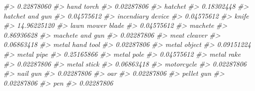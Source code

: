 \documentclass[
]{krantz}
\makeatletter
\newenvironment{Shaded}{\begin{snugshade}}{\end{snugshade}}
\newcommand{\CommentTok}[1]{\textcolor[rgb]{0.37,0.37,0.37}{\textit{#1}}}
\newenvironment{kframe}{%
\medskip{}
\setlength{\fboxsep}{.8em}
 \def\at@end@of@kframe{}%
 \ifinner\ifhmode%
  \def\at@end@of@kframe{\end{minipage}}%
  \begin{minipage}{\columnwidth}%
 \fi\fi%
 \def\FrameCommand##1{\hskip\@totalleftmargin \hskip-\fboxsep
 \colorbox{shadecolor}{##1}\hskip-\fboxsep
     \hskip-\linewidth \hskip-\@totalleftmargin \hskip\columnwidth}%
 \MakeFramed {\advance\hsize-\width
   \@totalleftmargin\z@ \linewidth\hsize
   \@setminipage}}%
 {\par\unskip\endMakeFramed%
 \at@end@of@kframe}
\renewenvironment{Shaded}{\begin{kframe}}{\end{kframe}}
\makeatother
\begin{document}
\begin{Shaded}
\begin{Highlighting}[]
\CommentTok{\#\textgreater{}                       0.22878060 }
\CommentTok{\#\textgreater{}                       hand torch }
\CommentTok{\#\textgreater{}                       0.02287806 }
\CommentTok{\#\textgreater{}                          hatchet }
\CommentTok{\#\textgreater{}                       0.18302448 }
\CommentTok{\#\textgreater{}                  hatchet and gun }
\CommentTok{\#\textgreater{}                       0.04575612 }
\CommentTok{\#\textgreater{}                incendiary device }
\CommentTok{\#\textgreater{}                       0.04575612 }
\CommentTok{\#\textgreater{}                            knife }
\CommentTok{\#\textgreater{}                      14.96225120 }
\CommentTok{\#\textgreater{}                 lawn mower blade }
\CommentTok{\#\textgreater{}                       0.04575612 }
\CommentTok{\#\textgreater{}                          machete }
\CommentTok{\#\textgreater{}                       0.86936628 }
\CommentTok{\#\textgreater{}                  machete and gun }
\CommentTok{\#\textgreater{}                       0.02287806 }
\CommentTok{\#\textgreater{}                     meat cleaver }
\CommentTok{\#\textgreater{}                       0.06863418 }
\CommentTok{\#\textgreater{}                  metal hand tool }
\CommentTok{\#\textgreater{}                       0.02287806 }
\CommentTok{\#\textgreater{}                     metal object }
\CommentTok{\#\textgreater{}                       0.09151224 }
\CommentTok{\#\textgreater{}                       metal pipe }
\CommentTok{\#\textgreater{}                       0.25165866 }
\CommentTok{\#\textgreater{}                       metal pole }
\CommentTok{\#\textgreater{}                       0.04575612 }
\CommentTok{\#\textgreater{}                       metal rake }
\CommentTok{\#\textgreater{}                       0.02287806 }
\CommentTok{\#\textgreater{}                      metal stick }
\CommentTok{\#\textgreater{}                       0.06863418 }
\CommentTok{\#\textgreater{}                       motorcycle }
\CommentTok{\#\textgreater{}                       0.02287806 }
\CommentTok{\#\textgreater{}                         nail gun }
\CommentTok{\#\textgreater{}                       0.02287806 }
\CommentTok{\#\textgreater{}                              oar }
\CommentTok{\#\textgreater{}                       0.02287806 }
\CommentTok{\#\textgreater{}                       pellet gun }
\CommentTok{\#\textgreater{}                       0.02287806 }
\CommentTok{\#\textgreater{}                              pen }
\CommentTok{\#\textgreater{}                       0.02287806 }

\end{Highlighting}
\end{Shaded}
\end{document}
